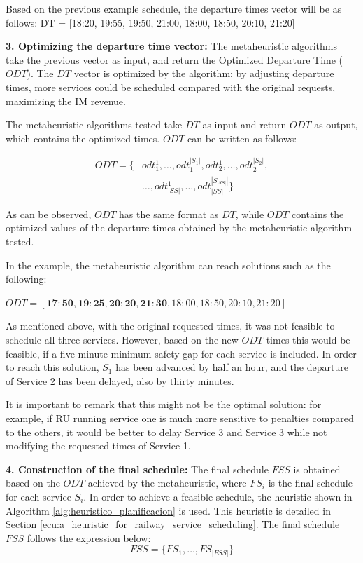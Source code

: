 \documentclass[Afour,sagev,times]{sagej}
\begin{document}
    Based on the previous example schedule, the departure times vector will be as follows: DT = [18:20, 19:55, 19:50, 21:00, 18:00, 18:50, 20:10, 21:20]
    
\noindent \textbf{3. Optimizing the departure time vector:} The metaheuristic algorithms take the previous vector as input, and return the Optimized Departure Time ($ODT$). The $DT$ vector is optimized by the algorithm; by adjusting departure times, more services could be scheduled compared with the original requests, maximizing the \gls{IM} revenue.

The metaheuristic algorithms tested take $DT$ as input and return $ODT$ as output, which contains the optimized times. $ ODT $ can be written as follows:
    
\begin{equation}\label{ecu:opt_departure_times}
\begin{aligned}
    ODT = \{ & odt_1^1, \dots, odt_1^{|S_1|}, odt_2^1, \dots, odt_2^{|S_2|}, \\
             & \dots, odt_{|SS|}^1, \dots, odt_{|SS|}^{|S_{|SS|}|} \}
\end{aligned}
\end{equation}
    
    As can be observed, $ODT$ has the same format as $DT$, while $ ODT $ contains the optimized values of the departure times obtained by the metaheuristic algorithm tested.

    In the example, the metaheuristic algorithm can reach solutions such as the following: 
    
    $ODT = [\mathbf{17:50}, \mathbf{19:25}, \mathbf{20:20}, \mathbf{21:30}, 18:00, 18:50, 20:10, 21:20]$

    As mentioned above, with the original requested times, it was not feasible to schedule all three services. However, based on the new $ODT$ times this would be feasible, if a five minute minimum safety gap for each service is included. In order to reach this solution, $S_1$ has been advanced by half an hour, and the departure of Service 2 has been delayed, also by thirty minutes.        

    It is important to remark that this might not be the optimal solution: for example, if \gls{RU} running service one is much more sensitive to penalties compared to the others, it would be better to delay Service 3 and Service 3 while not modifying the requested times of Service 1.
    
\noindent  \textbf{4. Construction of the final schedule:} The final schedule $FSS$ is obtained based on the $ODT$ achieved by the metaheuristic, where $FS_i$ is the final schedule for each service $S_i$. In order to achieve a feasible schedule, the heuristic shown in Algorithm \ref{alg:heuristico_planificacion} is used. This heuristic is detailed in Section \ref{ecu:a_heuristic_for_railway_service_scheduling}. The final schedule $FSS$ follows the expression below:
    \begin{equation}\label{ecu:final_set_of_schedule}
        FSS = \{ FS_1, \dots, FS_{|FSS|} \}
    \end{equation}
    
\end{document}
